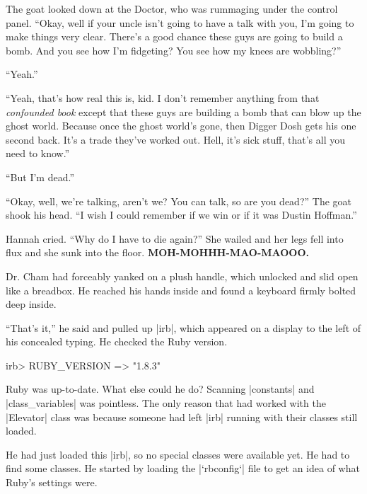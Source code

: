\documentclass[12pt,twoside]{report}
\begin{document}
The goat looked down at the Doctor, who was rummaging under the
control panel.  ``Okay, well if your uncle isn't going to have a talk
with you, I'm going to make things very clear.  There's a good chance
these guys are going to build a bomb.  And you see how I'm fidgeting?
You see how my knees are wobbling?''

``Yeah.''

``Yeah, that's how real this is, kid.  I don't remember anything from
that {\em confounded book} except that these guys are building a bomb
that can blow up the ghost world.  Because once the ghost world's
gone, then Digger Dosh gets his one second back.  It's a trade they've
worked out.  Hell, it's sick stuff, that's all you need to know.''

``But I'm dead.''

``Okay, well, we're talking, aren't we?  You can talk, so are you
dead?''  The goat shook his head. ``I wish I could remember if we win
or if it was Dustin Hoffman.''

Hannah cried.  ``Why do I have to die again?''  She wailed and her
legs fell into flux and she sunk into the floor.  {\bf
  MOH-MOHHH-MAO-MAOOO.}

Dr. Cham had forceably yanked on a plush handle, which unlocked and
slid open like a breadbox. He reached his hands inside and found a
keyboard firmly bolted deep inside.

``That's it,'' he said and pulled up \rubyinline|irb|,
which appeared on a display to the left of his concealed typing.  He
checked the Ruby version.


\begin{consolecode}

 irb> RUBY_VERSION
   => "1.8.3"

\end{consolecode}


Ruby was up-to-date.  What else could he do?  Scanning
\rubyinline|constants| and
\rubyinline|class_variables| was pointless. The only
reason that had worked with the \rubyinline|Elevator|
class was because someone had left \rubyinline|irb|
running with their classes still loaded.

He had just loaded this \rubyinline|irb|, so no
special classes were available yet.  He had to find some classes. He
started by loading the \rubyinline|`rbconfig`| file to
get an idea of what Ruby's settings were.


\end{document}
